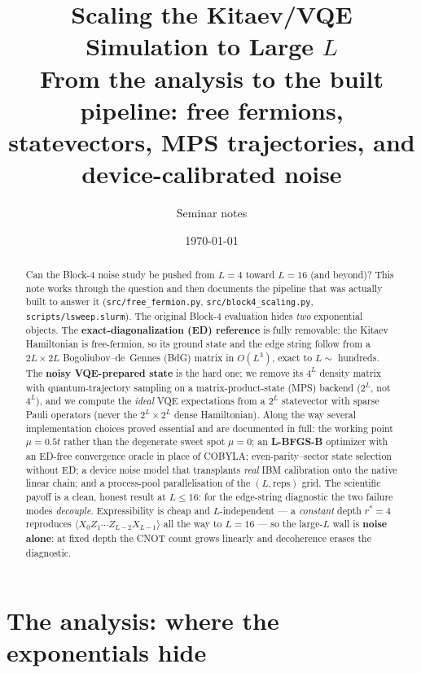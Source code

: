 \documentclass[11pt]{article}
\title{Scaling the Kitaev/VQE Simulation to Large $L$\\
\large From the analysis to the built pipeline: free fermions, statevectors,
MPS trajectories, and device-calibrated noise}
\author{Seminar notes}
\date{\today}
\newcommand{\Oedge}{X_0 Z_1\cdots Z_{L-2} X_{L-1}}
\newcommand{\expv}[1]{\langle #1\rangle}
\newcommand{\code}[1]{\texttt{#1}}
\begin{document}
\maketitle

\begin{abstract}
Can the Block-4 noise study be pushed from $L=4$ toward $L=16$ (and beyond)?
This note works through the question and then documents the pipeline that was
actually built to answer it (\code{src/free\_fermion.py},
\code{src/block4\_scaling.py}, \code{scripts/lsweep.slurm}). The original
Block-4 evaluation hides \emph{two} exponential objects. The
\textbf{exact-diagonalization (ED) reference} is fully removable: the Kitaev
Hamiltonian is free-fermion, so its ground state and the edge string follow from
a $2L\times 2L$ Bogoliubov--de~Gennes (BdG) matrix in $O(L^3)$, exact to
$L\sim$ hundreds. The \textbf{noisy VQE-prepared state} is the hard one; we
remove its $4^L$ density matrix with quantum-trajectory sampling on a
matrix-product-state (MPS) backend ($2^L$, not $4^L$), and we compute the
\emph{ideal} VQE expectations from a $2^L$ statevector with sparse Pauli
operators (never the $2^L\times2^L$ dense Hamiltonian). Along the way several
implementation choices proved essential and are documented in full: the working
point $\mu=0.5t$ rather than the degenerate sweet spot $\mu=0$; an
\textbf{L-BFGS-B} optimizer with an ED-free convergence oracle in place of
COBYLA; even-parity--sector state selection without ED; a device noise model
that transplants \emph{real} IBM calibration onto the native linear chain; and a
process-pool parallelisation of the $(L,\text{reps})$ grid. The scientific
payoff is a clean, honest result at $L\le 16$: for the edge-string diagnostic
the two failure modes \emph{decouple}. Expressibility is cheap and
$L$-independent --- a \emph{constant} depth $r^\ast=4$ reproduces $\expv{\Oedge}$
all the way to $L=16$ --- so the large-$L$ wall is \textbf{noise alone}: at fixed
depth the CNOT count grows linearly and decoherence erases the diagnostic.
\end{abstract}

\tableofcontents

\part{The analysis: where the exponentials hide}
\end{document}
